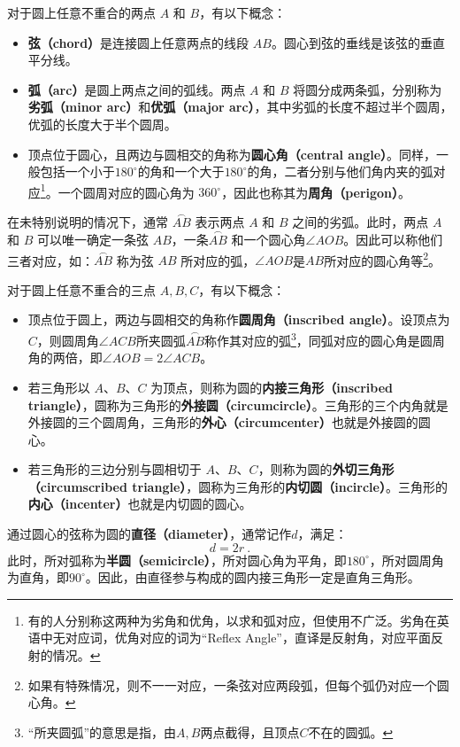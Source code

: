 对于圆上任意不重合的两点 $A$ 和 $B$，有以下概念：
\begin{itemize}
\item \textbf{弦（chord）}是连接圆上任意两点的线段 $AB$。圆心到弦的垂线是该弦的垂直平分线。
\item \textbf{弧（arc）}是圆上两点之间的弧线。两点 $A$ 和 $B$ 将圆分成两条弧，分别称为\textbf{劣弧（minor arc）}和\textbf{优弧（major arc）}，其中劣弧的长度不超过半个圆周，优弧的长度大于半个圆周。
\item 顶点位于圆心，且两边与圆相交的角称为\textbf{圆心角（central angle）}。同样，一般包括一个小于$180^\circ$的角和一个大于$180^\circ$的角，二者分别与他们角内夹的弧对应\footnote{有的人分别称这两种为劣角和优角，以求和弧对应，但使用不广泛。劣角在英语中无对应词，优角对应的词为“Reflex Angle”，直译是反射角，对应平面反射的情况。}。一个圆周对应的圆心角为 $360^\circ$，因此也称其为\textbf{周角（perigon）}。
\end{itemize}

在未特别说明的情况下，通常 $\overset{\frown}{AB}$ 表示两点 $A$ 和 $B$ 之间的劣弧。此时，两点 $A$ 和 $B$ 可以唯一确定一条弦 $AB$，一条$\overset{\frown}{AB}$ 和一个圆心角$\angle AOB$。因此可以称他们三者对应，如：$\overset{\frown}{AB}$ 称为弦 $AB$ 所对应的弧，$\angle AOB$是$AB$所对应的圆心角等\footnote{如果有特殊情况，则不一一对应，一条弦对应两段弧，但每个弧仍对应一个圆心角。}。

对于圆上任意不重合的三点 $A,B,C$，有以下概念：
\begin{itemize}
\item 顶点位于圆上，两边与圆相交的角称作\textbf{圆周角（inscribed angle）}。设顶点为$C$，则圆周角$\angle ACB$所夹圆弧$\overset{\frown}{AB}$称作其对应的弧\footnote{“所夹圆弧”的意思是指，由$A,B$两点截得，且顶点$C$不在的圆弧。}，同弧对应的圆心角是圆周角的两倍，即$\angle AOB=2\angle ACB$。
\item 若三角形以 $A$、$B$、$C$ 为顶点，则称为圆的\textbf{内接三角形（inscribed triangle）}，圆称为三角形的\textbf{外接圆（circumcircle）}。三角形的三个内角就是外接圆的三个圆周角，三角形的\textbf{外心（circumcenter）}也就是外接圆的圆心。
\item 若三角形的三边分别与圆相切于 $A$、$B$、$C$，则称为圆的\textbf{外切三角形（circumscribed triangle）}，圆称为三角形的\textbf{内切圆（incircle）}。三角形的\textbf{内心（incenter）}也就是内切圆的圆心。
\end{itemize}

通过圆心的弦称为圆的\textbf{直径（diameter）}，通常记作$d$，满足：
\begin{equation}
d = 2r~.
\end{equation}
此时，所对弧称为\textbf{半圆（semicircle）}，所对圆心角为平角，即$180^\circ$，所对圆周角为直角，即$90^\circ$。因此，由直径参与构成的圆内接三角形一定是直角三角形。

